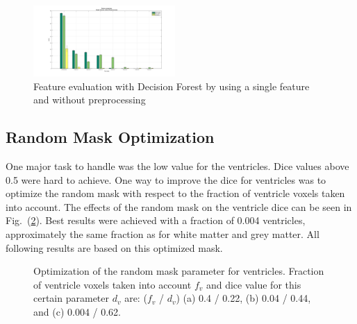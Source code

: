 \documentclass[journal]{IEEEtran}
\begin{document}
\begin{figure}\label{DF_FeatEval_SF_NPP}
	\centering
	\includegraphics[width=0.48\textwidth]{images/DF_FeatEval_SF_NPP}
	\caption{Feature evaluation with Decision Forest by using a single feature and without preprocessing }
\end{figure}

\subsection{Random Mask Optimization}

One major task to handle was the low value for the ventricles. Dice values above 0.5 were hard to achieve. One way to improve the dice for ventricles was to optimize the random mask with respect to the fraction of ventricle voxels taken into account. The effects of the random mask on the ventricle dice can be seen in Fig.~(\ref{f.random_mask}). Best results were achieved with a fraction of 0.004 ventricles, approximately the same fraction as for white matter and grey matter. All following results are based on this optimized mask.
\begin{figure}[h!]
	\centering
	\hfill
	\hfill
	\caption{Optimization of the random mask parameter for ventricles. Fraction of ventricle voxels taken into account $f_v$ and dice value for this certain parameter $d_v$ are: ($f_v$ / $d_v$) (a) 0.4 / 0.22, (b) 0.04 / 0.44, and (c) 0.004 / 0.62.}
	\label{f.random_mask}
\end{figure}
\end{document}
